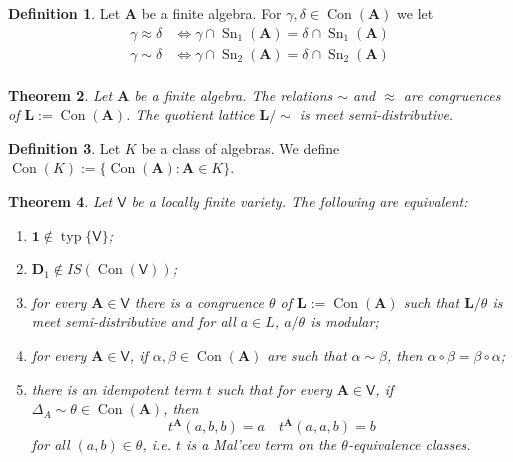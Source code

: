 \documentclass{amsart}
\theoremstyle{plain}
\newtheorem{theorem}{Theorem}[section]
\theoremstyle{definition}
\newtheorem{definition}[theorem]{Definition}
\theoremstyle{remark}
\DeclareMathOperator{\Con}{Con}
\DeclareMathOperator{\typ}{typ}
\DeclareMathOperator{\Sn}{Sn}
\begin{document}
\begin{definition}
    Let $\mathbf{A}$ be a finite algebra. 
    For $\gamma, \delta \in \Con(\mathbf{A})$ we let 
    \begin{align*}
        \gamma \approx \delta & \iff \gamma \cap \Sn_1(\mathbf{A}) = \delta \cap \Sn_1(\mathbf{A})\\
        \gamma \sim \delta & \iff \gamma \cap \Sn_2(\mathbf{A}) = \delta \cap \Sn_2(\mathbf{A})\\
    \end{align*}
\end{definition}

\begin{theorem}
    \label{lemma_msd}
    Let $\mathbf{A}$ be a finite algebra. 
    The relations $\sim$ and $\approx$ are congruences of $\mathbf{L}:=\Con(\mathbf{A})$. 
    The quotient lattice $\mathbf{L}/\sim$ is meet semi-distributive. 
\end{theorem}

\begin{definition}
    Let $K$ be a class of algebras.
    We define $\Con(K):=\{\Con(\mathbf{A}) : \mathbf{A} \in K\}$. 
\end{definition}

\begin{theorem}
    \label{theorem_msd}
    Let $\mathsf{V}$ be a locally finite variety.
    The following are equivalent: 
    \begin{enumerate}
        \item $\mathbf{1} \notin \typ\{\mathsf{V}\}$; 
        \item $\mathbf{D}_1 \notin IS(\Con(\mathsf{V}))$;
        \item for every $\mathbf{A} \in \mathsf{V}$ there is a congruence $\theta$ of $\mathbf{L}:=\Con(\mathbf{A})$ such that 
        $\mathbf{L}/\theta$ is meet semi-distributive and for all $a \in L$, $a / \theta$ is modular; 
        \item for every $\mathbf{A} \in \mathsf{V}$, if $\alpha, \beta \in \Con(\mathbf{A})$ are such that $\alpha \sim \beta$, then $\alpha \circ \beta = \beta \circ \alpha$; 
        \item there is an idempotent term $t$ such that for every $\mathbf{A} \in \mathsf{V}$, if $\Delta_A \sim \theta \in \Con(\mathbf{A})$, then
        \begin{equation*}
            t^\mathbf{A}(a,b,b)=a \quad t^{\mathbf{A}}(a,a,b)=b 
        \end{equation*}
        for all $(a,b) \in \theta$, i.e. $t$ is a Mal'cev term on the $\theta$-equivalence classes. 
    \end{enumerate}
\end{theorem}
\end{document}
